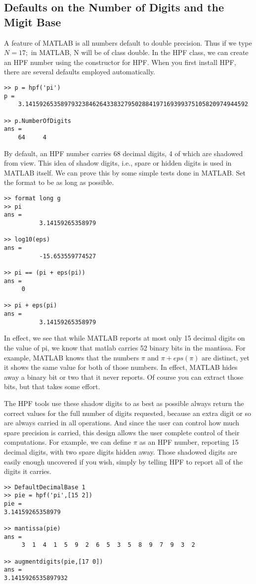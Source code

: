 \documentclass[a4paper,12pt]{article}
\begin{document}
\subsection{Defaults on the Number of Digits and the Migit Base}

A feature of MATLAB is all numbers default to double precision. Thus if we type $N = 17;$ in MATLAB, N will be of class double. In the HPF class, we can create an HPF number using the constructor for HPF. When you first install HPF, there are several defaults employed automatically.
\newpage
\begin{lstlisting}
>> p = hpf('pi')
p =
    3.141592653589793238462643383279502884197169399375105820974944592

>> p.NumberOfDigits
ans =
    64     4
\end{lstlisting}

By default, an HPF number carries 68 decimal digits, 4 of which are shadowed from view. This idea of shadow digits, i.e., spare or hidden digits is used in MATLAB itself. We can prove this by some simple tests done in MATLAB. Set the format to be as long as possible.

\begin{lstlisting}
>> format long g
>> pi
ans =
          3.14159265358979

>> log10(eps)
ans =
          -15.653559774527

>> pi == (pi + eps(pi))
ans =
     0

>> pi + eps(pi)
ans =
          3.14159265358979
\end{lstlisting}

In effect, we see that while MATLAB reports at most only 15 decimal digits on the value of pi, we know that matlab carries 52 binary bits in the mantissa. For example, MATLAB knows that the numbers $\pi$ and $\pi + eps(\pi)$ are distinct, yet it shows the same value for both of those numbers. In effect, MATLAB hides away a binary bit or two that it never reports. Of course you can extract those bits, but that takes some effort.

The HPF tools use these shadow digits to as best as possible always return the correct values for the full number of digits requested, because an extra digit or so are always carried in all operations. And since the user can control how much spare precision is carried, this design allows the user complete control of their computations. For example, we can define $\pi$ as an HPF number, reporting 15 decimal digits, with two spare digits hidden away. Those shadowed digits are easily enough uncovered if you wish, simply by telling HPF to report all of the digits it carries.
\newpage
\begin{lstlisting}
>> DefaultDecimalBase 1
>> pie = hpf('pi',[15 2])
pie =
3.14159265358979

>> mantissa(pie)
ans =
     3  1  4  1  5  9  2  6  5  3  5  8  9  7  9  3  2

>> augmentdigits(pie,[17 0])
ans =
3.1415926535897932
\end{lstlisting}
\end{document}
